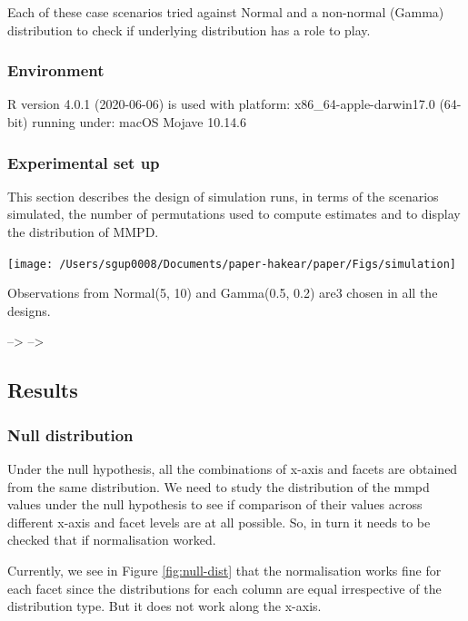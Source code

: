 \documentclass[
]{article}
\begin{document}
Each of these case scenarios tried against Normal and a non-normal (Gamma) distribution to check if underlying distribution has a role to play.

\hypertarget{environment}{%
\subsubsection{Environment}\label{environment}}

R version 4.0.1 (2020-06-06) is used with platform: x86\_64-apple-darwin17.0 (64-bit) running under: macOS Mojave 10.14.6

\hypertarget{experimental-set-up}{%
\subsubsection{Experimental set up}\label{experimental-set-up}}

This section describes the design of simulation runs, in terms of the scenarios simulated, the number of permutations used to compute estimates and to display the distribution of MMPD.

\begin{center}\texttt{[image: /Users/sgup0008/Documents/paper-hakear/paper/Figs/simulation]} \end{center}

Observations from Normal(5, 10) and Gamma(0.5, 0.2) are3 chosen in all the designs.

--\textgreater{}
--\textgreater{}

\hypertarget{results}{%
\subsection{Results}\label{results}}

\hypertarget{null-distribution}{%
\subsubsection{Null distribution}\label{null-distribution}}

Under the null hypothesis, all the combinations of x-axis and facets are obtained from the same distribution. We need to study the distribution of the mmpd values under the null hypothesis to see if comparison of their values across different x-axis and facet levels are at all possible. So, in turn it needs to be checked that if normalisation worked.

Currently, we see in Figure \ref{fig:null-dist} that the normalisation works fine for each facet since the distributions for each column are equal irrespective of the distribution type. But it does not work along the x-axis.
\end{document}
